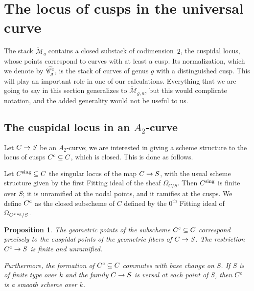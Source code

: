 \documentclass[a4paper, 10pt]{amsart}
\numberwithin{equation}{section}
\numberwithin{subsection}{section}
\newtheorem{proposition}[theorem]{Proposition}
\theoremstyle{definition}
\theoremstyle{remark}
\renewcommand{\mathcal}{\mathscr}
\newcommand\arr{\ifinner\to\else\longrightarrow\fi}
\renewcommand\th{^\text{th}}
\newcommand{\Ctilde}{\widetilde{\mathcal C}}
\newcommand{\cu}{^{\rm c}}
\newcommand{\sing}{^{\rm sing}}
\newcommand{\mt}{\widetilde{\mathcal M}}
\newcommand{\modangelo}{\marginpar{}}
\begin{document}
	\section{The locus of cusps in the universal curve}\modangelo
	
	The stack $\mt_{g}$ contains a closed substack of codimension~$2$, the cuspidal locus, whose points correspond to curves with at least a cusp. Its normalization, which we denote by $\Ctilde\cu_g$, is the stack of curves of genus $g$ with a distinguished cusp. This will play an important role in one of our calculations. Everything that we are going to say in this section generalizes to $\mt_{g,n}$, but this would complicate notation, and the added generality would not be useful to us.
	

	
	\subsection{The cuspidal locus in an $A_{2}$-curve}
	Let $C \arr S$ be an $A_2$-curve; we are interested in giving a scheme structure to the locus of cusps $C\cu \subseteq C$, which is closed. This is done as follows.
	
	Let $C\sing \subseteq C$ the singular locus of the map $C \arr S$, with the usual scheme structure given by the first Fitting ideal of the sheaf $\Omega_{C/S}$. Then $C\sing$ is finite over $S$; it is unramified at the nodal points, and it ramifies at the cusps. We define $C\cu$ as the closed subscheme of $C$ defined by the $0\th$ Fitting ideal of $\Omega_{C\sing/S}$. 
	
	\begin{proposition}\label{prop:cuspidal-projection}
		The geometric points of the subscheme $C\cu  \subseteq C$ correspond precisely to the cuspidal points of the geometric fibers of $C \arr S$. The restriction $C\cu \arr S$ is finite and unramified. 
		
		Furthermore, the formation of $C\cu \subseteq C$ commutes with base change on $S$. If $S$ is of finite type over $k$ and the family $C \arr S$ is versal at each point of $S$, then $C\cu$ is a smooth scheme over $k$. 
	\end{proposition}
	
\end{document}
